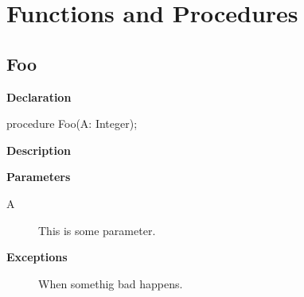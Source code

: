 \documentclass{report}
\newif\ifpdf
\begin{document}
\section{Functions and Procedures}
\ifpdf
\subsection*{\large{\textbf{Foo}}\normalsize\hspace{1ex}\hrulefill}
\else
\subsection*{Foo}
\fi
\label{A-Foo}
\begin{list}{}{
\setlength{\itemindent}{0cm}
\setlength{\listparindent}{0cm}
\setlength{\leftmargin}{\evensidemargin}
\addtolength{\leftmargin}{\tmplength}
\settowidth{\labelsep}{X}
\addtolength{\leftmargin}{\labelsep}
\setlength{\labelwidth}{\tmplength}
}
\item[\textbf{Declaration}\hfill]
\ifpdf
\begin{flushleft}
\fi
\begin{ttfamily}
procedure Foo(A: Integer);\end{ttfamily}

\ifpdf
\end{flushleft}
\fi

\par
\item[\textbf{Description}]
 \par
\item[\textbf{Parameters}]
\begin{description}
\item[A] This is some parameter.
\end{description}
\item[\textbf{Exceptions}]
\begin{description}
\item[\begin{ttfamily}TMyException\end{ttfamily}(\ref{A.TMyException})] When somethig bad happens.
\end{description}


\end{list}
\end{document}
